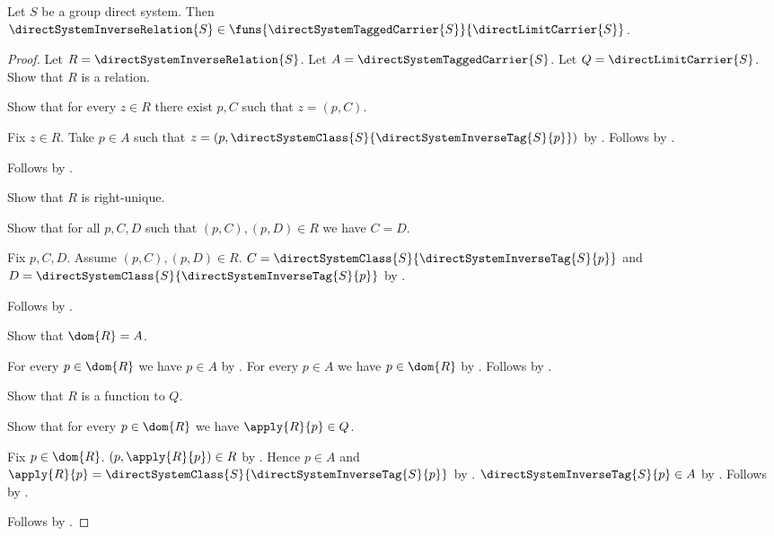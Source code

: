 \begin{theorem}\label{direct_system_inverse_relation_type}
    Let $S$ be a group direct system.
    Then $\directSystemInverseRelation{S}\in
        \funs{\directSystemTaggedCarrier{S}}{\directLimitCarrier{S}}$.
\end{theorem}
\begin{proof}
    Let $R=\directSystemInverseRelation{S}$.
    Let $A=\directSystemTaggedCarrier{S}$.
    Let $Q=\directLimitCarrier{S}$.
    Show that $R$ is a relation.
    \begin{subproof}
        Show that for every $z\in R$ there exist $p,C$ such that
            $z=(p,C)$.
        \begin{subproof}
            Fix $z\in R$.
            Take $p\in A$ such that
                $z=(p,\directSystemClass{S}
                    {\directSystemInverseTag{S}{p}})$ by
                .
            Follows by \auto.
        \end{subproof}
        Follows by .
    \end{subproof}
    Show that $R$ is right-unique.
    \begin{subproof}
        Show that for all $p,C,D$ such that $(p,C),(p,D)\in R$
            we have $C=D$.
        \begin{subproof}
            Fix $p,C,D$.
            Assume $(p,C),(p,D)\in R$.
            $C=\directSystemClass{S}{\directSystemInverseTag{S}{p}}$ and
                $D=\directSystemClass{S}{\directSystemInverseTag{S}{p}}$ by
                .
        \end{subproof}
        Follows by .
    \end{subproof}
    Show that $\dom{R}=A$.
    \begin{subproof}
        For every $p\in\dom{R}$ we have $p\in A$ by
            .
        For every $p\in A$ we have $p\in\dom{R}$ by
            .
        Follows by .
    \end{subproof}
    Show that $R$ is a function to $Q$.
    \begin{subproof}
        Show that for every $p\in\dom{R}$ we have
            $\apply{R}{p}\in Q$.
        \begin{subproof}
            Fix $p\in\dom{R}$.
            $(p,\apply{R}{p})\in R$ by
                .
            Hence $p\in A$ and
                $\apply{R}{p}=\directSystemClass{S}
                    {\directSystemInverseTag{S}{p}}$ by
                .
            $\directSystemInverseTag{S}{p}\in A$ by
                .
            Follows by .
        \end{subproof}
    \end{subproof}
    Follows by .
\end{proof}

